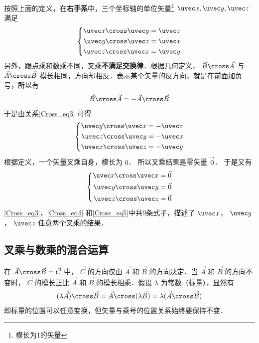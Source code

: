 按照上面的定义，在\textbf{右手系}中，三个坐标轴的单位矢量\footnote{模长为1的矢量} $\uvec x, \uvec y, \uvec z$ 满足
\begin{equation}\label{Cross_eq3}
\left\{ \begin{aligned}
\uvec x \cross \uvec y &= \uvec z\\
\uvec y \cross \uvec z &= \uvec x\\
\uvec z \cross \uvec x &= \uvec y
\end{aligned} \right.
\end{equation}
另外，跟点乘和数乘不同，叉乘\textbf{不满足交换律}．根据几何定义， $\vec B \cross \vec A$ 与 $\vec A \cross \vec B$ 模长相同，方向却相反．表示某个矢量的反方向，就是在前面加负号，所以有
\begin{equation}\label{Cross_eq11}
\vec B \cross \vec A = -\vec A \cross \vec B
\end{equation}
于是由关系\autoref{Cross_eq3} 可得
\begin{equation}\label{Cross_eq4}
\left\{ \begin{aligned}
\uvec y \cross \uvec x &=  - \uvec z\\
\uvec z \cross \uvec y &=  - \uvec x\\
\uvec x \cross \uvec z &=  - \uvec y
\end{aligned} \right.
\end{equation}
根据定义，一个矢量叉乘自身，模长为 $0$． 所以叉乘结果是零矢量 $\vec 0$． 于是又有
\begin{equation}\label{Cross_eq5}
\left\{ \begin{aligned}
\uvec x \cross \uvec x &= \vec 0\\
\uvec y \cross \uvec y &= \vec 0\\
\uvec z \cross \uvec z &= \vec 0
\end{aligned} \right.
\end{equation}
\autoref{Cross_eq3}，\autoref{Cross_eq4} 和\autoref{Cross_eq5}中共9条式子，描述了 $\uvec x$，  $\uvec y$，  $\uvec z$ 任意两个叉乘的结果．

\subsection{叉乘与数乘的混合运算}

在 $\vec A \cross \vec B = \vec C$ 中， $\vec C$ 的方向仅由 $\vec A$ 和 $\vec B$ 的方向决定．当 $\vec A$ 和 $\vec B$ 的方向不变时， $\vec C$ 的模长正比 $\vec A$ 和 $\vec B$ 的模长相乘．假设 $\lambda $ 为常数（标量），显然有
\begin{equation}
(\lambda \vec A) \cross \vec B = \vec A \cross (\lambda \vec B) = \lambda (\vec A \cross \vec B)
\end{equation}
即标量的位置可以任意变换，但矢量与乘号的位置关系始终要保持不变．

